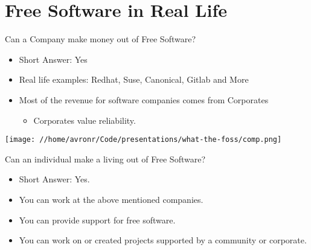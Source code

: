 \documentclass[presentation]{beamer}
\begin{document}
\section*{Free Software in Real Life}
\label{sec:org847b9f9}
\begin{frame}[label={sec:org998676b}]{Can a Company make money out of Free Software?}
\begin{itemize}
\item Short Answer: Yes
\item Real life examples: Redhat, Suse, Canonical, Gitlab and More
\item Most of the revenue for software companies comes from Corporates
\begin{itemize}
\item Corporates value reliability.
\end{itemize}
\end{itemize}

\begin{center}
\texttt{[image: //home/avronr/Code/presentations/what-the-foss/comp.png]}
\end{center}
\end{frame}
\begin{frame}[label={sec:orgc2b8aa1}]{Can an individual make a living out of Free Software?}
\begin{itemize}
\item Short Answer: Yes.
\item You can work at the above mentioned companies.
\item You can provide support for free software.
\item You can work on or created projects supported by a community or corporate.
\end{itemize}
\end{frame}
\end{document}
